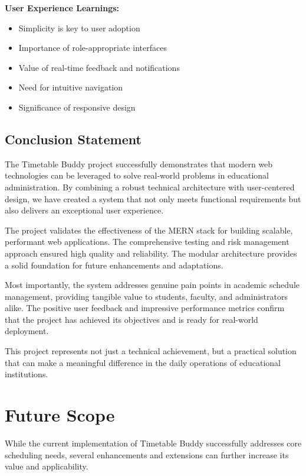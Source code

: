 \textbf{User Experience Learnings:}
\begin{itemize}
    \item Simplicity is key to user adoption
    \item Importance of role-appropriate interfaces
    \item Value of real-time feedback and notifications
    \item Need for intuitive navigation
    \item Significance of responsive design
\end{itemize}

\subsection{Conclusion Statement}

The Timetable Buddy project successfully demonstrates that modern web technologies can be leveraged to solve real-world problems in educational administration. By combining a robust technical architecture with user-centered design, we have created a system that not only meets functional requirements but also delivers an exceptional user experience.

The project validates the effectiveness of the MERN stack for building scalable, performant web applications. The comprehensive testing and risk management approach ensured high quality and reliability. The modular architecture provides a solid foundation for future enhancements and adaptations.

Most importantly, the system addresses genuine pain points in academic schedule management, providing tangible value to students, faculty, and administrators alike. The positive user feedback and impressive performance metrics confirm that the project has achieved its objectives and is ready for real-world deployment.

This project represents not just a technical achievement, but a practical solution that can make a meaningful difference in the daily operations of educational institutions.

\section{Future Scope}

While the current implementation of Timetable Buddy successfully addresses core scheduling needs, several enhancements and extensions can further increase its value and applicability.

